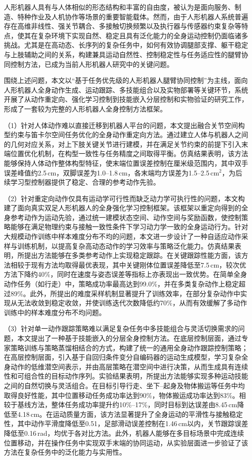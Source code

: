 \begin{cabstract}
人形机器人具有与人体相似的形态结构和丰富的自由度，被认为是面向服务、制造、特种作业及人机协作等场景的重要智能载体。然而，由于人形机器人系统普遍存在高维非线性、强关节耦合、多接触切换频繁以及执行器与传感器约束复杂等特点，使其在复杂环境下实现自然、稳定且具有泛化能力的全身运动控制仍面临诸多挑战。尤其是在高动态、长序列的复杂任务中，如何有效协调腿部支撑、躯干稳定与上肢辅助之间的关系，构建兼具运动自然性、控制稳定性与任务适应性的腿臂协同控制方法，已成为当前人形机器人研究中的关键问题。

围绕上述问题，本文以“基于任务优先级的人形机器人腿臂协同控制”为主线，面向人形机器人全身动作生成、运动跟踪、多技能组合以及实物部署等关键环节，系统开展了从动作重定向、强化学习控制到技能嵌入分层控制和实物验证的研究工作，形成了一套较为完整的人形机器人全身控制方法框架。

（1）针对人体动作难以直接迁移到机器人平台的问题，本文提出融合关节空间构型约束与笛卡尔空间任务优化的全身动作重定向方法。通过建立人体与机器人之间的几何对应关系，对上下肢关键关节进行建模，并在满足关节约束的前提下引入末端位置优化机制，在构型一致性与任务精度之间取得平衡。仿真结果表明，该方法能够保持人体动作整体构型特征，使末端位置误差控制在厘米级范围内，其中双手误差峰值约2.5\,cm，双脚误差为1.0--1.8\,cm，各末端均方误差为1.5--2.5\,cm$^2$，为后续学习型控制器提供了稳定、合理的参考动作先验。

（2）针对重定向动作仅具有运动学可行性而缺乏动力学可执行性的问题，本文构建了面向真实双足人形机器人的全身强化学习控制框架。该框架以重定向得到的全身参考动作为运动先验，通过统一建模状态空间、动作空间与奖励函数，使控制策略能够在满足物理约束与接触一致性条件下学习动力学一致的全身运动行为。针对大规模动作训练中样本难度分布不均的问题，本文进一步设计了一种自适应动作采样与训练机制，以提高复杂高动态动作的学习效率与策略泛化能力。仿真结果表明，所提出方法能够在多类参考动作上实现稳定跟踪。在关键跟踪性能方面，该方法相较于现有方法均取得最优表现，其中关键刚体位置误差降低至7.5\,cm，较次优方法下降约40\%，同时在速度与姿态误差等指标上亦表现出一致优势。在简单全身动作任务（如行走）中，策略成功率最高达到99.0\%，并在多类复杂动作上稳定超过89\%。此外，所提出的难度采样机制显著提升了训练效率，在部分复杂动作中实现从无法收敛到稳定收敛，并使训练迭代次数降低约70\%，从而有效缓解了多动作训练中的样本难度分布不均问题。

（3）针对单一动作跟踪策略难以满足复杂任务中多技能组合与灵活切换需求的问题，本文提出了一种基于技能嵌入的分层全身控制方法。在底层控制层面，通过专家策略训练与策略蒸馏相结合的方式，构建了统一的通用全身动作跟踪控制策略；在高层控制层面，引入基于自回归条件变分自编码器的运动生成模型，学习复杂全身动作的低维潜空间表示，并由高层策略在潜空间中进行决策，从而生成具有连续性和可组合性的目标动作序列。实验结果表明，所提出方法能够实现多种运动技能之间的自然切换与灵活组合。在目标引导行走、坐下--起身及物体搬运等任务中均取得良好性能，其中位置移动任务成功率达到90\%，物体搬运成功率达到83\%。相较于基线方法，整体任务成功率提升约10\%--17\%，同时目标到达误差由8.45\,cm降低至4.18\,cm。在运动质量方面，该方法显著提升了全身运动的平滑性与接触稳定性，其中动作平滑度降低至0.51，足部滑动误差控制在1.46\,cm以内，关节跟踪误差降低至0.16\,rad，均优于各对比方法。此外，机器人能够在多目标场景中完成连续位置移动，并在操作任务中实现双手末端的协同运动，从实验层面进一步验证了该方法在复杂任务中的泛化能力与实用性。


\end{cabstract}
